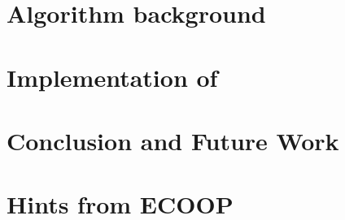 \documentclass[nonatbib,preprint,numbers]{sigplanconf}
\begin{document}
\section{Algorithm background}
\label{section:algorithm}


\section{Implementation of \Fajita}
\label{section:implementation}


\section{Conclusion and Future Work}
\label{section:zz}


\small


\clearpage
\appendix
\section{Hints from ECOOP}
\label{section:ecoop}

\end{document}
